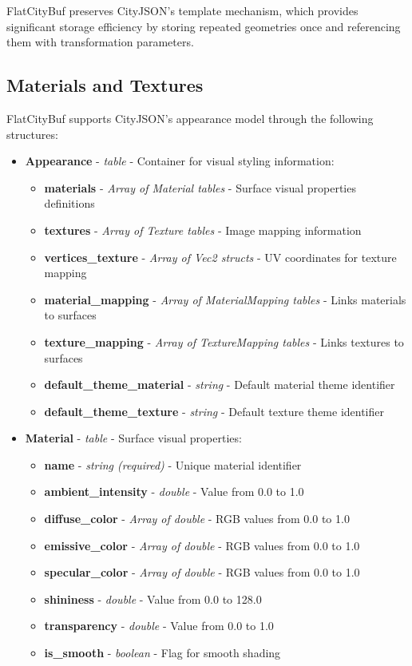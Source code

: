 FlatCityBuf preserves CityJSON's template mechanism, which provides significant storage efficiency by storing repeated geometries once and referencing them with transformation parameters.

\subsection{Materials and Textures}
\label{methodology:feature_encoding:materials_textures}

FlatCityBuf supports CityJSON's appearance model through the following structures:

\begin{itemize}
  \item \textbf{Appearance} - \textit{table} - Container for visual styling information:
    \begin{itemize}
      \item \textbf{materials} - \textit{Array of Material tables} - Surface visual properties definitions
      \item \textbf{textures} - \textit{Array of Texture tables} - Image mapping information
      \item \textbf{vertices\_texture} - \textit{Array of Vec2 structs} - UV coordinates for texture mapping
      \item \textbf{material\_mapping} - \textit{Array of MaterialMapping tables} - Links materials to surfaces
      \item \textbf{texture\_mapping} - \textit{Array of TextureMapping tables} - Links textures to surfaces
      \item \textbf{default\_theme\_material} - \textit{string} - Default material theme identifier
      \item \textbf{default\_theme\_texture} - \textit{string} - Default texture theme identifier
    \end{itemize}

  \item \textbf{Material} - \textit{table} - Surface visual properties:
    \begin{itemize}
      \item \textbf{name} - \textit{string (required)} - Unique material identifier
      \item \textbf{ambient\_intensity} - \textit{double} - Value from 0.0 to 1.0
      \item \textbf{diffuse\_color} - \textit{Array of double} - RGB values from 0.0 to 1.0
      \item \textbf{emissive\_color} - \textit{Array of double} - RGB values from 0.0 to 1.0
      \item \textbf{specular\_color} - \textit{Array of double} - RGB values from 0.0 to 1.0
      \item \textbf{shininess} - \textit{double} - Value from 0.0 to 128.0
      \item \textbf{transparency} - \textit{double} - Value from 0.0 to 1.0
      \item \textbf{is\_smooth} - \textit{boolean} - Flag for smooth shading
    \end{itemize}


\end{itemize}
